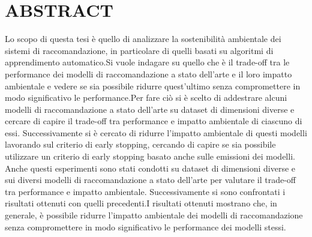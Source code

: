 \section*{ABSTRACT}
Lo scopo di questa tesi è quello di analizzare la sostenibilità ambientale dei sistemi di raccomandazione, in particolare di quelli basati su algoritmi di apprendimento automatico.Si vuole indagare su quello che è il trade-off tra le performance dei modelli di raccomandazione a stato dell'arte e il loro impatto ambientale e vedere se sia possibile ridurre quest'ultimo senza compromettere in modo significativo le performance.Per fare ciò si è scelto di addestrare alcuni modelli di raccomandazione a stato dell'arte su dataset di dimensioni diverse e cercare di capire il trade-off tra performance e impatto ambientale di ciascuno di essi. Successivamente si è cercato di ridurre l'impatto ambientale di questi modelli lavorando sul criterio di early stopping, cercando di capire se sia possibile utilizzare un criterio di early stopping basato anche sulle emissioni dei modelli. Anche questi esperimenti sono stati condotti su dataset di dimensioni diverse e sui diversi modelli di raccomandazione a stato dell'arte per valutare il trade-off tra performance e impatto ambientale. Successivamente si sono confrontati i risultati ottenuti con quelli precedenti.I risultati ottenuti mostrano che, in generale, è possibile ridurre l'impatto ambientale dei modelli di raccomandazione senza compromettere in modo significativo le performance dei modelli stessi.
\setcounter{section}{0}
\renewcommand{\thesection}{\arabic{section}}